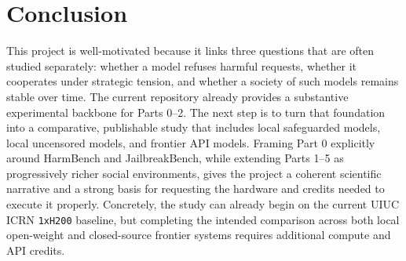 \documentclass{article}
\begin{document}
\section{Conclusion}
This project is well-motivated because it links three questions that are often studied separately: whether a model refuses harmful requests, whether it cooperates under strategic tension, and whether a society of such models remains stable over time. The current repository already provides a substantive experimental backbone for Parts 0--2. The next step is to turn that foundation into a comparative, publishable study that includes local safeguarded models, local uncensored models, and frontier API models. Framing Part 0 explicitly around HarmBench and JailbreakBench, while extending Parts 1--5 as progressively richer social environments, gives the project a coherent scientific narrative and a strong basis for requesting the hardware and credits needed to execute it properly. Concretely, the study can already begin on the current UIUC ICRN \texttt{1xH200} baseline, but completing the intended comparison across both local open-weight and closed-source frontier systems requires additional compute and API credits.
\end{document}

